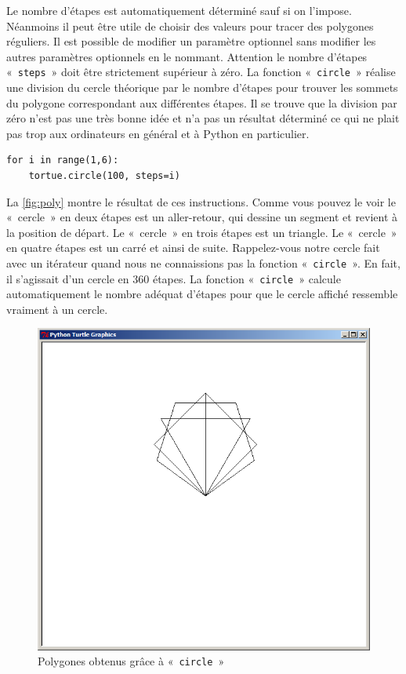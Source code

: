 Le nombre d'étapes est automatiquement déterminé sauf si on l'impose. Néanmoins il peut être utile de choisir des valeurs pour tracer des polygones réguliers. Il est possible de modifier un paramètre optionnel sans modifier les autres paramètres optionnels en le nommant. Attention le nombre d'étapes «~\texttt{steps}~» doit être strictement supérieur à zéro. La fonction «~\texttt{circle}~» réalise une division du cercle théorique par le nombre d'étapes pour trouver les sommets du polygone correspondant aux différentes étapes. Il se trouve que la division par zéro n'est pas une très bonne idée et n'a pas un résultat déterminé ce qui ne plait pas trop aux ordinateurs en général et à Python en particulier.

\begin{Verbatim}[frame=single,rulecolor=\color{mbleu}, label=à taper]
for i in range(1,6):
	tortue.circle(100, steps=i)
\end{Verbatim}


La \autoref{fig:poly} montre le résultat de ces instructions. 
Comme vous pouvez le voir le «~cercle~» en deux étapes est un aller-retour, qui dessine un segment et revient à la position de départ.
Le «~cercle~» en trois étapes est un triangle. Le «~cercle~» en quatre étapes est un carré et ainsi de suite. 
Rappelez-vous notre cercle fait avec un itérateur quand nous ne connaissions pas la fonction «~\texttt{circle}~».
En fait, il s'agissait d'un cercle en 360 étapes. La fonction «~\texttt{circle}~» calcule automatiquement le nombre adéquat d'étapes pour que le cercle affiché ressemble vraiment à un cercle.

\begin{figure}[H]
\centering
\includegraphics[scale=0.4]{images/poly}
\caption{Polygones obtenus grâce à «~\texttt{circle}~»}\label{fig:poly}
\end{figure}

